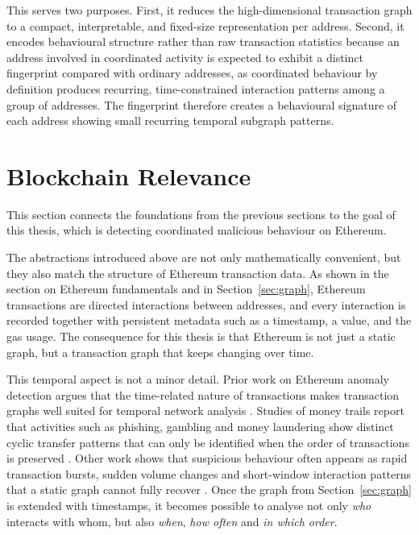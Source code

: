 \documentclass{thesisclass}
\begin{document}
This serves two purposes. First, it reduces the high-dimensional transaction graph to a compact, interpretable, and fixed-size representation per address. Second, it encodes behavioural structure rather than raw transaction statistics because an address involved in coordinated activity is expected to exhibit a distinct fingerprint compared with ordinary addresses, as coordinated behaviour by definition produces recurring, time-constrained interaction patterns among a group of addresses. The fingerprint therefore creates a behavioural signature of each address showing small recurring temporal subgraph patterns.

\section{Blockchain Relevance}
\label{sec:blockchain_relevance}

This section connects the foundations from the previous sections to the goal of this thesis, which is detecting coordinated malicious behaviour on Ethereum.

The abstractions introduced above are not only mathematically convenient, but they also match the structure of Ethereum transaction data. As shown in the section on Ethereum fundamentals and in Section~\ref{sec:graph}, Ethereum transactions are directed interactions between addresses, and every interaction is recorded together with persistent metadata such as a timestamp, a value, and the gas usage. The consequence for this thesis is that Ethereum is not just a static graph, but a transaction graph that keeps changing over time.

This temporal aspect is not a minor detail. Prior work on Ethereum anomaly detection argues that the time-related nature of transactions makes transaction graphs well suited for temporal network analysis \citep{pohlmann2019anomaly}. Studies of money trails report that activities such as phishing, gambling and money laundering show distinct cyclic transfer patterns that can only be identified when the order of transactions is preserved \citep{lal2021money}. Other work shows that suspicious behaviour often appears as rapid transaction bursts, sudden volume changes and short-window interaction patterns that a static graph cannot fully recover \citep{temporal_sampling_ethereum, ghoshcatalog2025}. Once the graph from Section~\ref{sec:graph} is extended with timestamps, it becomes possible to analyse not only \emph{who} interacts with whom, but also \emph{when}, \emph{how often} and \emph{in which order}.
\end{document}
